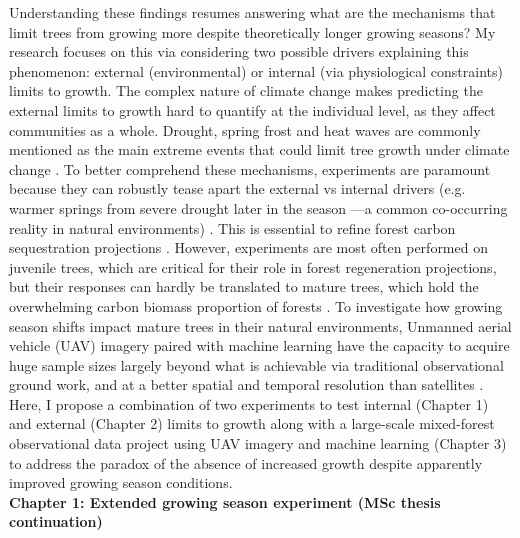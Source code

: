 \documentclass[12pt]{article}
\begin{document}
Understanding these findings resumes answering what are the mechanisms that limit trees from growing more despite theoretically longer growing seasons? My research focuses on this via considering two possible drivers explaining this phenomenon: external (environmental) \cite{kolar_response_2016} or internal (via physiological constraints)\cite{zohner_effect_2023} limits to growth. The complex nature of climate change makes predicting the external limits to growth hard to quantify at the individual level, as they affect communities as a whole. Drought, spring frost and heat waves are commonly mentioned as the main extreme events that could limit tree growth under climate change \cite{tyree_xylem_2002, choat_triggers_2018, li_widespread_2023,trenberth_global_2014,intergovernmental_panel_on_climate_change_detection_2014,chiang_evidence_2021,polgar_leafout_2011,reinmann_compensatory_2023}. To better comprehend these mechanisms, experiments are paramount because they can robustly tease apart the external vs internal drivers (e.g. warmer springs from severe drought later in the season ---a common co-occurring reality in natural environments) \cite{morin_changes_2010,primack_observations_2015}. This is essential to refine forest carbon sequestration projections \cite{green_limits_2022,cabon_cross-biome_2022}. However, experiments are most often performed on juvenile trees, which are critical for their role in forest regeneration projections, but their responses can hardly be translated to mature trees, which hold the overwhelming carbon biomass proportion of forests \cite{augspurger_differences_2003,silvestro_longer_2023,vitasse_ontogenic_2013}. To investigate how growing season shifts impact mature trees in their natural environments, Unmanned aerial vehicle (UAV) imagery paired with machine learning have the capacity to acquire huge sample sizes largely beyond what is achievable via traditional observational ground work, and at a better spatial and temporal resolution than satellites \cite{berra_assessing_2019,piao_plant_2019,teng_bringing_2025}. Here, I propose a combination of two experiments to test internal (Chapter 1) and external (Chapter 2) limits to growth along with a large-scale mixed-forest observational data project using UAV imagery and machine learning (Chapter 3) to address the paradox of the absence of increased growth despite apparently improved growing season conditions. \\
\textbf{Chapter 1: Extended growing season experiment (MSc thesis continuation)}
\end{document}
